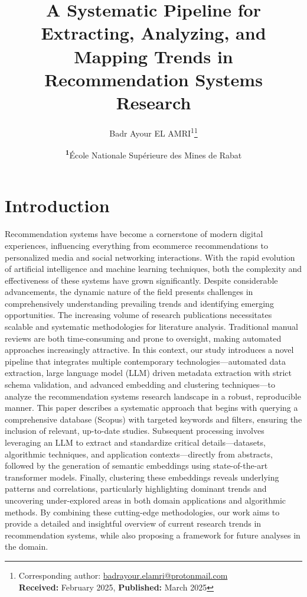 \documentclass[
	a4paper, %
	10pt, %
	unnumberedsections, %
	twoside, %
]{LTJournalArticle}
\title{A Systematic Pipeline for Extracting, Analyzing, and Mapping Trends in Recommendation Systems Research} %
\author{%
	Badr Ayour EL AMRI\textsuperscript{1}\thanks{Corresponding author: \href{mailto:badrayour.elamri@protonmail.com}{badrayour.elamri@protonmail.com}\\ \textbf{Received:} February 2025, \textbf{Published:} March 2025}
}
\date{\footnotesize\textsuperscript{\textbf{1}}École Nationale Supérieure des Mines de Rabat}
\begin{document}
\maketitle %


\section{Introduction}

Recommendation systems have become a cornerstone of modern digital experiences, influencing everything from ecommerce recommendations to personalized media and social networking interactions. With the rapid evolution of artificial intelligence and machine learning techniques, both the complexity and effectiveness of these systems have grown significantly. Despite considerable advancements, the dynamic nature of the field presents challenges in comprehensively understanding prevailing trends and identifying emerging opportunities.
The increasing volume of research publications necessitates scalable and systematic methodologies for literature analysis. Traditional manual reviews are both time-consuming and prone to oversight, making automated approaches increasingly attractive. In this context, our study introduces a novel pipeline that integrates multiple contemporary technologies—automated data extraction, large language model (LLM) driven metadata extraction with strict schema validation, and advanced embedding and clustering techniques—to analyze the recommendation systems research landscape in a robust, reproducible manner.
This paper describes a systematic approach that begins with querying a comprehensive database (Scopus) with targeted keywords and filters, ensuring the inclusion of relevant, up-to-date studies. Subsequent processing involves leveraging an LLM to extract and standardize critical details—datasets, algorithmic techniques, and application contexts—directly from abstracts, followed by the generation of semantic embeddings using state-of-the-art transformer models. Finally, clustering these embeddings reveals underlying patterns and correlations, particularly highlighting dominant trends and uncovering under-explored areas in both domain applications and algorithmic methods.
By combining these cutting-edge methodologies, our work aims to provide a detailed and insightful overview of current research trends in recommendation systems, while also proposing a framework for future analyses in the domain.
\end{document}
